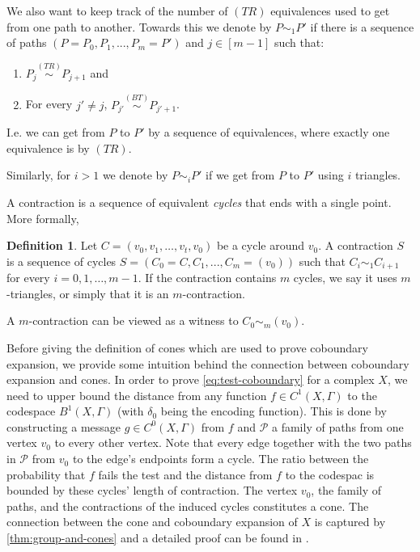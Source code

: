 \documentclass[10pt,a4paper]{article}
\newcommand{\prettyref}[1]{\cref{#1}}
\theoremstyle{definition}
\newtheorem{definition}[theorem]{Definition}
\theoremstyle{remark}
\newcommand{\Authornotecolored}[3]{{\sffamily\small\color{#1}{[#2: #3]}}}
\newcommand{\Authornotecolored}[3]{}
\newcommand{\Ynote}{\Authornotecolored{Purple}{Y}}
\newcommand{\Snote}{\Authornotecolored{Green}{S}}
\newcommand{\snote}{\Snote}
\def\cont{f}
\numberwithin{equation}{section}
\let\pref=\prettyref
\newcommand{\coboundary}{{\delta}}
\def\cont{S}
\begin{document}
We also want to keep track of the number of \((TR)\) equivalences used to get from one path to another. Towards this we denote by \(P \sim_1 P'\) if there is a sequence of paths \((P=P_0,P_1,...,P_m=P')\) and \(j \in [m-1]\) such that:
\begin{enumerate}
    \item \(P_j \overset{(TR)}{\sim} P_{j+1}\) and
    \item For every \(j' \ne j\), \(P_{j'} \overset{(BT)}{\sim} P_{j'+1}\).
\end{enumerate}
\snote{notation general note check number correspondence and put defined things first.}
I.e. we can get from \(P\) to \(P'\) by a sequence of equivalences, where exactly one equivalence is by \((TR)\).

Similarly, for \(i >1\) we denote by \(P \sim_i P'\) if we get from \(P\) to \(P'\) using \(i\) triangles. 

A contraction is a sequence of equivalent \textit{cycles} that ends with a single point. More formally,
\begin{definition}
    Let \(C = (v_0,v_1,\dots,v_t,v_0)\) be a cycle around \(v_0\). A contraction \(\cont\) is a sequence of cycles \(\cont = (C_0 = C,C_1,...,C_m = (v_0))\) such that \(C_i \sim_1 C_{i+1}\) for every \(i=0,1,\dots,m-1\). If the contraction contains \(m\) cycles, we say it uses \(m\)-triangles, or simply that it is an \(m\)-contraction.
\end{definition}
A \(m\)-contraction can be viewed as a witness to \(C_0 \sim_m (v_0)\).




Before giving the definition of cones which are used to prove coboundary expansion, we provide some intuition behind the connection between coboundary expansion and cones.
%
\Ynote{I think maybe not adding words such as `codespace' and `message'? I don't feel too strongly about this though.}In order to prove \pref{eq:test-coboundary} for a complex $X$, we need to upper bound the distance from any function $f\in C^1(X,\Gamma)$ to the codespace $B^1(X,\Gamma)$ (with $\coboundary_0$ being the encoding function). This is done by constructing a message $g\in  C^0(X,\Gamma)$ from $f$ and $\mathcal{P}$ a family of paths from one vertex $v_0$ to every other vertex. 
Note that every edge together with the two paths in $\mathcal{P}$ from $v_0$ to the edge's endpoints form a cycle.
The ratio between the probability that $f$ fails the test and the distance from $f$ to the codespac is bounded by these cycles' length of contraction.  
The vertex $v_0$, the family of paths, and the contractions of the induced cycles constitutes a cone. 
The connection between the cone and coboundary expansion of $X$ is captured by \pref{thm:group-and-cones} and a detailed proof can be found in \cite{DiksteinD2023swap}.
\end{document}
